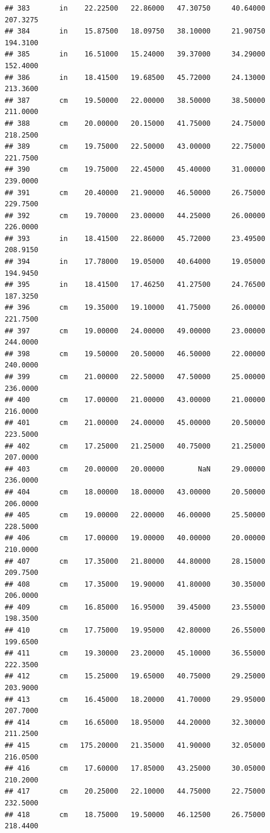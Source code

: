 \documentclass[]{article}
\begin{document}
\begin{verbatim}
## 383       in    22.22500   22.86000   47.30750     40.64000  207.3275
## 384       in    15.87500   18.09750   38.10000     21.90750  194.3100
## 385       in    16.51000   15.24000   39.37000     34.29000  152.4000
## 386       in    18.41500   19.68500   45.72000     24.13000  213.3600
## 387       cm    19.50000   22.00000   38.50000     38.50000  211.0000
## 388       cm    20.00000   20.15000   41.75000     24.75000  218.2500
## 389       cm    19.75000   22.50000   43.00000     22.75000  221.7500
## 390       cm    19.75000   22.45000   45.40000     31.00000  239.0000
## 391       cm    20.40000   21.90000   46.50000     26.75000  229.7500
## 392       cm    19.70000   23.00000   44.25000     26.00000  226.0000
## 393       in    18.41500   22.86000   45.72000     23.49500  208.9150
## 394       in    17.78000   19.05000   40.64000     19.05000  194.9450
## 395       in    18.41500   17.46250   41.27500     24.76500  187.3250
## 396       cm    19.35000   19.10000   41.75000     26.00000  221.7500
## 397       cm    19.00000   24.00000   49.00000     23.00000  244.0000
## 398       cm    19.50000   20.50000   46.50000     22.00000  240.0000
## 399       cm    21.00000   22.50000   47.50000     25.00000  236.0000
## 400       cm    17.00000   21.00000   43.00000     21.00000  216.0000
## 401       cm    21.00000   24.00000   45.00000     20.50000  223.5000
## 402       cm    17.25000   21.25000   40.75000     21.25000  207.0000
## 403       cm    20.00000   20.00000        NaN     29.00000  236.0000
## 404       cm    18.00000   18.00000   43.00000     20.50000  206.0000
## 405       cm    19.00000   22.00000   46.00000     25.50000  228.5000
## 406       cm    17.00000   19.00000   40.00000     20.00000  210.0000
## 407       cm    17.35000   21.80000   44.80000     28.15000  209.7500
## 408       cm    17.35000   19.90000   41.80000     30.35000  206.0000
## 409       cm    16.85000   16.95000   39.45000     23.55000  198.3500
## 410       cm    17.75000   19.95000   42.80000     26.55000  199.6500
## 411       cm    19.30000   23.20000   45.10000     36.55000  222.3500
## 412       cm    15.25000   19.65000   40.75000     29.25000  203.9000
## 413       cm    16.45000   18.20000   41.70000     29.95000  207.7000
## 414       cm    16.65000   18.95000   44.20000     32.30000  211.2500
## 415       cm   175.20000   21.35000   41.90000     32.05000  216.0500
## 416       cm    17.60000   17.85000   43.25000     30.05000  210.2000
## 417       cm    20.25000   22.10000   44.75000     22.75000  232.5000
## 418       cm    18.75000   19.50000   46.12500     26.75000  218.4400

\end{verbatim}
\end{document}

